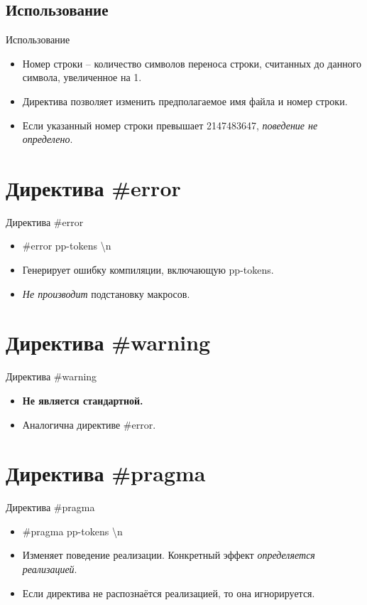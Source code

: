     \subsection{Использование}
    \begin{frame}{Использование}
        \begin{itemize}
            \item Номер строки -- количество символов переноса строки, считанных до данного символа, увеличенное на 1.
            \item Директива позволяет изменить предполагаемое имя файла и номер строки.
            \item Если указанный номер строки превышает 2147483647, \textit{поведение не определено}.
        \end{itemize}
    \end{frame}

    \section{Директива \#error}
    \begin{frame}{Директива \#error}
        \begin{itemize}
            \item \#error pp-tokens \textbackslash{n}
            \item Генерирует ошибку компиляции, включающую pp-tokens.
            \item \textit{Не производит} подстановку макросов.
        \end{itemize}
    \end{frame}

    \section{Директива \#warning}
    \begin{frame}{Директива \#warning}
        \begin{itemize}
            \item \textbf{Не является стандартной.}
            \item Аналогична директиве \#error.
        \end{itemize}
    \end{frame}

    \section{Директива \#pragma}
    \begin{frame}{Директива \#pragma}
        \begin{itemize}
            \item \#pragma pp-tokens \textbackslash{n}
            \item Изменяет поведение реализации. Конкретный эффект \textit{определяется реализацией}.
            \item Если директива не распознаётся реализацией, то она игнорируется.
        \end{itemize}
    \end{frame}

